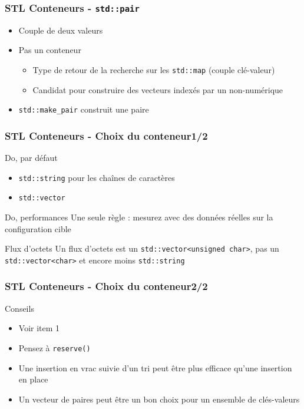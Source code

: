 \documentclass[C++.tex]{subfiles}
\begin{document}
\begin{frame}
	\frametitle{STL Conteneurs - \lstinline|std::pair|}
	\begin{itemize}
		\item Couple de deux valeurs
		\item Pas un conteneur
		\begin{itemize}
			\item Type de retour de la recherche sur les \lstinline|std::map| (couple clé-valeur)
			\item Candidat pour construire des vecteurs indexés par un non-numérique
		\end{itemize}
		\item \lstinline|std::make_pair| construit une paire
	\end{itemize}
\end{frame}

\begin{frame}
	\frametitle{STL Conteneurs - Choix du conteneur\titlehfill{}1/2}
	\begin{exampleblock}{Do, par défaut}
		\begin{itemize}
			\item \lstinline|std::string| pour les chaînes de caractères
			\item \lstinline|std::vector|
		\end{itemize}
	\end{exampleblock}		

	\begin{exampleblock}{Do, performances}
		Une seule règle : mesurez avec des données réelles sur la configuration cible
	\end{exampleblock}

	\begin{alertblock}{Flux d'octets}
		Un flux d'octets est un \lstinline|std::vector<unsigned char>|, pas un \lstinline|std::vector<char>| et encore moins \lstinline|std::string|
	\end{alertblock}
\end{frame}

\begin{frame}
	\frametitle{STL Conteneurs - Choix du conteneur\titlehfill{}2/2}
	\begin{block}{Conseils}
		\begin{itemize}
			\item Voir \cite{effStl} item 1
			\item Pensez à \lstinline|reserve()|
			\item Une insertion \og en vrac\fg{} suivie d'un tri peut être plus efficace qu'une insertion en place


			\item Un vecteur de paires peut être un bon choix pour un ensemble de clés-valeurs
		\end{itemize}
	\end{block}
\end{frame}
\end{document}
